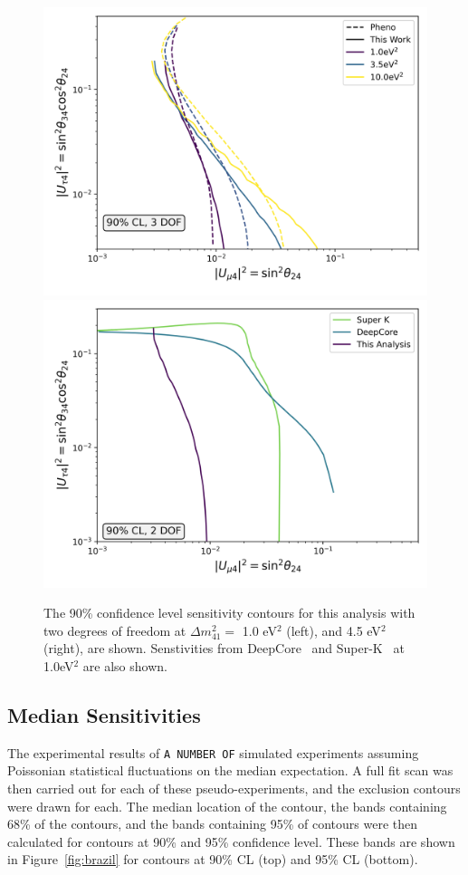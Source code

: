 \documentclass[main.tex]{subfiles}
\begin{document}
\begin{figure}
    \centering
    \includegraphics[width=0.45\linewidth]{figures/pheno_joint_asimov_oldairs_Realization_Asimov_sterile_0_cl0.9_dof3.png}%
    \includegraphics[width=0.45\linewidth]{figures/comparison.png}
    \caption{The 90\% confidence level sensitivity contours for this analysis with two degrees of freedom at $\Delta m_{41}^{2}=$ 1.0 eV$^{2}$ (left), and  4.5 eV$^{2}$ (right), are shown. Senstivities from DeepCore~\cite{Aartsen_2017_dc} and Super-K~\cite{PhysRevD.91.052019} at 1.0eV$^{2}$ are also shown.}\label{fig:experiment_compare}
\end{figure}


\subsection{Median Sensitivities}

The experimental results of \texttt{A NUMBER OF} simulated experiments assuming Poissonian statistical fluctuations on the median expectation.
A full fit scan was then carried out for each of these pseudo-experiments, and the exclusion contours were drawn for each.
The median location of the contour, the bands containing 68\% of the contours, and the bands containing 95\% of contours were then calculated for contours at 90\% and 95\% confidence level. 
These bands are shown in Figure~\ref{fig:brazil} for contours at 90\% CL (top) and 95\% CL (bottom).
\end{document}

